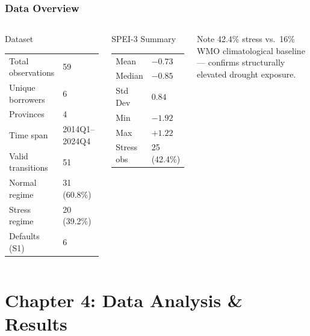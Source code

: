 \documentclass{beamer}
\newcommand{\ts}{\footnotesize}
\begin{document}
\begin{frame}
    \frametitle{Data Overview}
    \begin{columns}[T]
    \begin{block}{Dataset}
    \ts
    \begin{tabular}{@{}ll@{}}
        \toprule
        Total observations  & 59 \\
        Unique borrowers    & 6 \\
        Provinces           & 4 \\
        Time span           & 2014Q1--2024Q4 \\
        Valid transitions   & 51 \\
        \quad Normal regime & 31 (60.8\%) \\
        \quad Stress regime & 20 (39.2\%) \\
        Defaults (S1)       & 6 \\
        \bottomrule
    \end{tabular}
    \end{block}
    \begin{block}{SPEI-3 Summary}
    \ts
    \begin{tabular}{@{}ll@{}}
        \toprule
        Mean        & $-0.73$ \\
        Median      & $-0.85$ \\
        Std Dev     & $0.84$ \\
        Min         & $-1.92$ \\
        Max         & $+1.22$ \\
        Stress obs  & 25 (42.4\%) \\
        \bottomrule
    \end{tabular}
    \end{block}
    \vspace{0.3em}
    \begin{alertblock}{\small Note}
    \scriptsize 42.4\% stress vs.\ 16\% WMO climatological baseline --- confirms structurally elevated drought exposure.
    \end{alertblock}
    \end{columns}
\end{frame}

\section{Chapter 4: Data Analysis \& Results}
\end{document}
